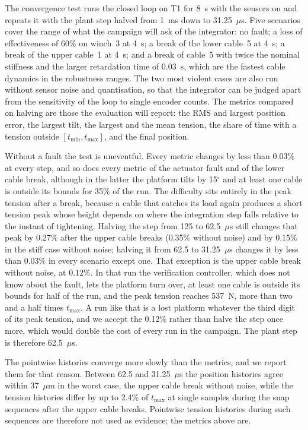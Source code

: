 \documentclass[10pt]{article}
\begin{document}
The convergence test runs the closed loop on T1 for 8~s with the sensors on and repeats it with the plant step halved from 1~ms down to 31.25~$\mu$s. Five scenarios cover the range of what the campaign will ask of the integrator: no fault; a loss of effectiveness of 60\% on winch~3 at 4~s; a break of the lower cable~5 at 4~s; a break of the upper cable~1 at 4~s; and a break of cable~5 with twice the nominal stiffness and the larger retardation time of 0.03~s, which are the fastest cable dynamics in the robustness ranges. The two most violent cases are also run without sensor noise and quantisation, so that the integrator can be judged apart from the sensitivity of the loop to single encoder counts. The metrics compared on halving are those the evaluation will report: the RMS and largest position error, the largest tilt, the largest and the mean tension, the share of time with a tension outside $[t_{\min},t_{\max}]$, and the final position.

Without a fault the test is uneventful. Every metric changes by less than 0.03\% at every step, and so does every metric of the actuator fault and of the lower cable break, although in the latter the platform tilts by 15$^\circ$ and at least one cable is outside its bounds for 35\% of the run. The difficulty sits entirely in the peak tension after a break, because a cable that catches its load again produces a short tension peak whose height depends on where the integration step falls relative to the instant of tightening. Halving the step from 125 to 62.5~$\mu$s still changes that peak by 0.27\% after the upper cable breaks (0.35\% without noise) and by 0.15\% in the stiff case without noise; halving it from 62.5 to 31.25~$\mu$s changes it by less than 0.03\% in every scenario except one. That exception is the upper cable break without noise, at 0.12\%. In that run the verification controller, which does not know about the fault, lets the platform turn over, at least one cable is outside its bounds for half of the run, and the peak tension reaches 537~N, more than two and a half times $t_{\max}$. A run like that is a lost platform whatever the third digit of its peak tension, and we accept the 0.12\% rather than halve the step once more, which would double the cost of every run in the campaign. The plant step is therefore 62.5~$\mu$s.

The pointwise histories converge more slowly than the metrics, and we report them for that reason. Between 62.5 and 31.25~$\mu$s the position histories agree within 37~$\mu$m in the worst case, the upper cable break without noise, while the tension histories differ by up to 2.4\% of $t_{\max}$ at single samples during the snap sequences after the upper cable breaks. Pointwise tension histories during such sequences are therefore not used as evidence; the metrics above are.
\end{document}
